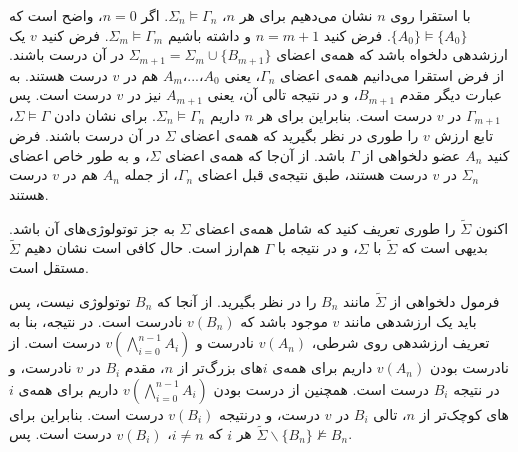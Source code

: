 \begin{ans}
\begin{enumerate}
    با استقرا روی $n$ نشان می‌دهیم برای هر $n$، $\Sigma_n \models \Gamma_n$.
    اگر $n=0$، واضح است که $\{A_0\} \models \{A_0\}$. فرض کنید $n=m+1$ و داشته باشیم $\Sigma_m \models \Gamma_m$. فرض کنید $v$ یک ارزشدهی دلخواه باشد که همه‌ی اعضای $\Sigma_{m+1} = \Sigma_m \cup \{ B_{m+1} \}$ در آن درست باشند. از فرض استقرا می‌دانیم همه‌ی اعضای $\Gamma_n$، یعنی $A_0$،...،$A_m$ هم در $v$ درست هستند. به عبارت دیگر مقدم $B_{m+1}$، و در نتیجه تالی آن، یعنی $A_{m+1}$ نیز در $v$ درست است. پس $\Gamma_{m+1}$ در $v$ درست است. بنابراین برای هر $n$ داریم $\Sigma_n \models \Gamma_n$. برای نشان دادن $\Sigma \models \Gamma$، تابع ارزش $v$ را طوری در نظر بگیرید که همه‌ی اعضای $\Sigma$ در آن درست باشند. فرض کنید $A_n$ عضو دلخواهی از $\Gamma$ باشد. از آن‌جا که همه‌ی اعضای $\Sigma$، و به طور خاص اعضای $\Sigma_n$ در $v$ درست هستند، طبق نتیجه‌ی قبل اعضای $\Gamma_n$، از جمله $A_n$ هم در $v$ درست هستند.

    اکنون $\tilde{\Sigma}$ را طوری تعریف کنید که شامل همه‌ی اعضای $\Sigma$ به جز توتولوژی‌های آن باشد. بدیهی است که $\tilde{\Sigma}$ با $\Sigma$، و در نتیجه با $\Gamma$ هم‌ارز است. حال کافی است نشان دهیم $\tilde{\Sigma}$ مستقل است.

    فرمول دلخواهی از $\tilde{\Sigma}$ مانند $B_n$ را در نظر بگیرید. از آنجا که $B_n$ توتولوژی نیست، پس باید یک ارزشدهی مانند $v$ موجود باشد که $v(B_n)$ نادرست است. در نتیجه، بنا به تعریف ارزشدهی روی شرطی، $v(A_n)$ نادرست و $v(\bigwedge_{i=0}^{n-1} A_i)$ درست است. از نادرست بودن $v(A_n)$ داریم برای همه‌ی $i$های بزرگ‌تر از $n$، مقدم $B_i$ در $v$ نادرست، و در نتیجه $B_i$ درست است. همچنین از درست بودن $v(\bigwedge_{i=0}^{n-1} A_i)$ داریم برای همه‌ی $i$های کوچک‌تر از $n$، تالی $B_i$ در $v$ درست، و درنتیجه $v(B_i)$ درست است. بنابراین برای هر $i$ که $i \neq n$، $v(B_i)$ درست است. پس $\tilde{\Sigma}\backslash\{B_n\} \not\models B_n$.

  \end{enumerate}
\end{ans}